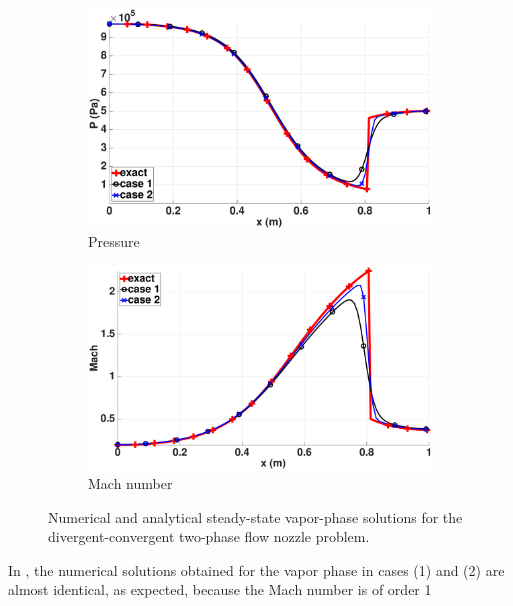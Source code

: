 \begin{figure}[H]
        \begin{subfigure}[b]{0.495\textwidth}
                \centering
                \includegraphics[width=\textwidth]{figures/vapor_pressure_llf_and_exact_100.eps}
                \caption{Pressure}
                \label{fig:vap-phase-press}
        \end{subfigure}        
        \begin{subfigure}[b]{0.495\textwidth}
                \centering
                \includegraphics[width=\textwidth]{figures/vapor_mach_llf_and_exact_100.eps}
                \caption{Mach number}
                \label{fig:vap-phase-mach}
        \end{subfigure}
        \caption{Numerical and analytical steady-state vapor-phase solutions for the divergent-convergent two-phase flow nozzle problem.}\label{fig:vap-phase}
\end{figure}
%
In , the numerical solutions obtained for the vapor phase in cases (1) and (2) are almost identical, as expected, because the Mach number is of order 1
